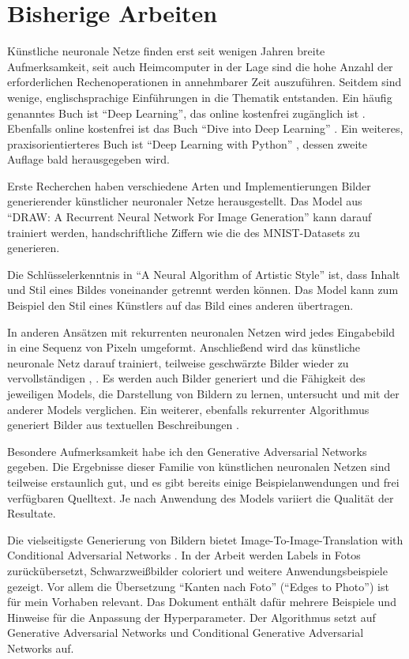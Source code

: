 \section{Bisherige Arbeiten}
\label{sec:related}
Künstliche neuronale Netze finden erst seit wenigen Jahren breite Aufmerksamkeit,
seit auch Heimcomputer in der Lage sind die hohe Anzahl der erforderlichen
Rechenoperationen in annehmbarer Zeit auszuführen. Seitdem sind wenige,
englischsprachige Einführungen in die Thematik entstanden. Ein häufig genanntes
Buch ist ``Deep Learning'', das online kostenfrei zugänglich ist \cite{Goodfellow-et-al-2016}.
Ebenfalls online kostenfrei ist das Buch ``Dive into Deep Learning'' \cite{zhang2020dive}.
Ein weiteres, praxisorientierteres Buch ist ``Deep Learning with Python'' \cite{chollet2017dlpython}, dessen
zweite Auflage bald herausgegeben wird.

Erste Recherchen haben verschiedene Arten und Implementierungen Bilder generierender künstlicher neuronaler Netze herausgestellt. Das Model aus ``DRAW: A Recurrent Neural Network For Image Generation'' \cite{gregor2015draw} kann darauf trainiert werden, handschriftliche Ziffern wie die des MNIST-Datasets zu generieren.

Die Schlüsselerkenntnis in ``A Neural Algorithm of Artistic Style'' \cite{gatys2015nst} ist, dass Inhalt und Stil eines Bildes voneinander getrennt werden können. Das Model kann zum Beispiel den Stil eines Künstlers auf das Bild eines anderen übertragen.

In anderen Ansätzen mit rekurrenten neuronalen Netzen wird jedes Eingabebild in eine Sequenz von Pixeln umgeformt. Anschließend wird das künstliche neuronale Netz darauf trainiert, teilweise geschwärzte Bilder wieder zu vervollständigen \cite{chen2020generative}, \cite{oord2016pixel}. Es werden auch Bilder generiert und die Fähigkeit des jeweiligen Models, die Darstellung von Bildern zu lernen, untersucht und mit der anderer Models verglichen. Ein weiterer, ebenfalls rekurrenter Algorithmus generiert Bilder aus textuellen Beschreibungen \cite{ramesh2021zeroshot}.

Besondere Aufmerksamkeit habe ich den Generative Adversarial Networks \cite{goodfellow2014generative} gegeben. Die Ergebnisse dieser Familie von künstlichen neuronalen Netzen sind teilweise erstaunlich gut, und es gibt bereits einige Beispielanwendungen und frei verfügbaren Quelltext. Je nach Anwendung des Models variiert die Qualität der Resultate.

Die vielseitigste Generierung von Bildern bietet Image-To-Image-Translation with Conditional Adversarial Networks \cite{isola2018imagetoimage}. In der Arbeit werden Labels in Fotos zurückübersetzt, Schwarzweißbilder coloriert und weitere Anwendungsbeispiele gezeigt. Vor allem die Übersetzung ``Kanten nach Foto'' (``Edges to Photo'') ist für mein Vorhaben relevant. Das Dokument enthält dafür mehrere Beispiele und Hinweise für die Anpassung der Hyperparameter. Der Algorithmus setzt auf Generative Adversarial Networks \cite{goodfellow2014generative} und Conditional Generative Adversarial Networks \cite{mirza2014conditional} auf.

